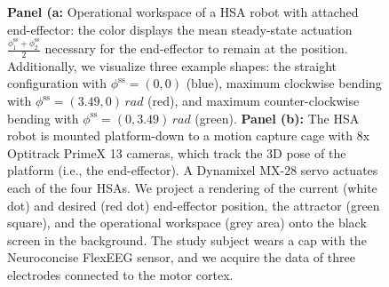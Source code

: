 \documentclass[letterpaper, 10pt, conference]{ieeeconf}      %
\begin{document}
\begin{figure}
\begin{center}
    \caption{\textbf{Panel (a:} Operational workspace of a HSA robot with attached end-effector: the color displays the mean steady-state actuation $\frac{\phi_1^\mathrm{ss} + \phi_2^\mathrm{ss}}{2}$ necessary for the end-effector to remain at the position. Additionally, we visualize three example shapes: the straight configuration with $\phi^\mathrm{ss} = (0, 0)$ (blue), maximum clockwise bending with $\phi^\mathrm{ss} = (3.49, 0) \, \si{rad}$ (red), and maximum counter-clockwise bending with $\phi^\mathrm{ss} = (0, 3.49) \, \si{rad}$ (green).
    \textbf{Panel (b):} The HSA robot is mounted platform-down to a motion capture cage with 8x Optitrack PrimeX 13 cameras, which track the 3D pose of the platform (i.e., the end-effector). A Dynamixel MX-28 servo actuates each of the four HSAs. We project a rendering of the current (white dot) and desired (red dot) end-effector position, the attractor (green square), and the operational workspace (grey area) onto the black screen in the background. The study subject wears a cap with the Neuroconcise FlexEEG sensor, and we acquire the data of three electrodes connected to the motor cortex.}
\end{center}
\end{figure}
\end{document}
